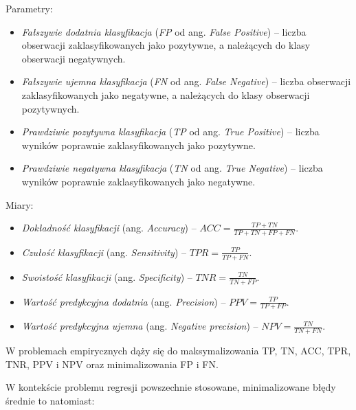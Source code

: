Parametry:
\begin{itemize}[noitemsep,nolistsep]
	\item \textit{Fałszywie dodatnia klasyfikacja} (\textit{FP} od ang. \textit{False Positive}) -- liczba obserwacji zaklasyfikowanych jako pozytywne, a należących do klasy obserwacji negatywnych.
	\item \textit{Fałszywie ujemna klasyfikacja} (\textit{FN} od ang. \textit{False Negative}) -- liczba obserwacji zaklasyfikowanych jako negatywne, a należących do klasy obserwacji pozytywnych. 
	\item \textit{Prawdziwie pozytywna klasyfikacja} (\textit{TP} od ang. \textit{True Positive}) -- liczba wyników poprawnie zaklasyfikowanych jako pozytywne. 
	\item \textit{Prawdziwie negatywna klasyfikacja} (\textit{TN} od ang. \textit{True Negative}) -- liczba wyników poprawnie zaklasyfikowanych jako negatywne.
\end{itemize}

Miary:
\begin{itemize}[noitemsep,nolistsep]
	\item \textit{Dokładność klasyfikacji} (ang. \textit{Accuracy}) -- $ACC = \frac{TP + TN}{TP+TN+FP+FN}$.
	\item \textit{Czułość klasyfikacji} (ang. \textit{Sensitivity}) -- $TPR = \frac{TP}{TP + FN}$.
	\item \textit{Swoistość klasyfikacji} (ang. \textit{Specificity}) -- $TNR = \frac{TN}{TN + FP}$.
	\item \textit{Wartość predykcyjna dodatnia} (ang. \textit{Precision}) -- $PPV = \frac{TP}{TP + FP}$.
	\item \textit{Wartość predykcyjna ujemna} (ang. \textit{Negative precision}) -- $NPV = \frac{TN}{TN + FN}$.
\end{itemize}

W problemach empirycznych dąży się do maksymalizowania TP, TN, ACC, TPR, TNR, PPV i NPV oraz minimalizowania FP i FN. 

W kontekście problemu regresji powszechnie stosowane, minimalizowane błędy średnie to natomiast:

